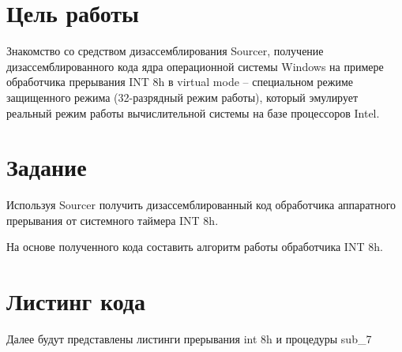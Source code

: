 \setcounter{page}{2}
\section*{Цель работы}

Знакомство со средством дизассемблирования Sourcer, получение дизассемблированного кода ядра операционной системы Windows на примере обработчика прерывания INT 8h в virtual mode – специальном режиме защищенного режима (32-разрядный режим работы), который эмулирует реальный режим работы  вычислительной системы на базе процессоров Intel.

\section*{Задание}

Используя Sourcer получить дизассемблированный код обработчика аппаратного прерывания от системного таймера INT 8h.

На основе полученного кода составить алгоритм работы обработчика INT 8h.

\section*{Листинг кода}
 Далее будут представлены листинги прерывания int 8h и процедуры sub\_7

